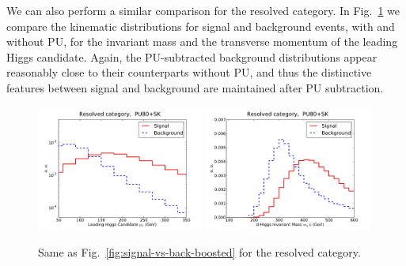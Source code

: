 We can also perform a similar comparison for
the resolved category.
%
In Fig.~\ref{fig:signal-vs-back-resolved} we compare
the kinematic distributions for signal and background events,
with and without PU, for the invariant mass and the
transverse momentum of the leading
     Higgs candidate.
     Again, the PU-subtracted background distributions
     appear reasonably close
     to their counterparts without PU, and thus
     the distinctive features between signal and background
     are maintained after PU subtraction.

\begin{figure}[t]
  \begin{center}
      \includegraphics[width=0.49\textwidth]{plots/pt_h0_res_comp_back.pdf}
   \includegraphics[width=0.49\textwidth]{plots/m_h0_res_comp_back.pdf}
     \caption{\small
       Same as Fig.~\ref{fig:signal-vs-back-boosted} for the resolved category.
}
\label{fig:signal-vs-back-resolved}
\end{center}
\end{figure}


